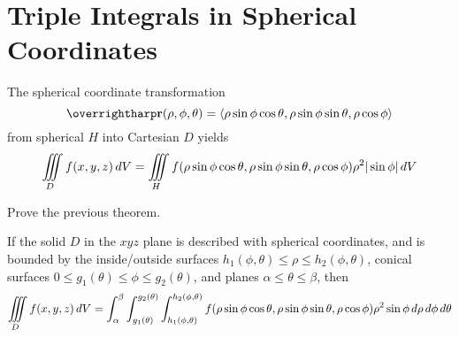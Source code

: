 \documentclass[letterpaper, twoside, 12pt]{book}
\begin{document}
          \begin{solution}

          \end{solution}

          \begin{contributors}

          \end{contributors}


\section{Triple Integrals in Spherical Coordinates} %

\begin{theorem}
  The spherical coordinate transformation
  \[
    \vect{r}(\rho,\phi,\theta)
      =
    \<\rho\sin\phi\cos\theta, \rho\sin\phi\sin\theta, \rho\cos\phi\>
  \]
  from spherical $H$ into Cartesian $D$ yields
  \[
    \iiint\limits_D f(x,y,z)\,d{V}
      =
    \iiint\limits_H
    f(\rho\sin\phi\cos\theta, \rho\sin\phi\sin\theta, \rho\cos\phi)
    \rho^2|\sin\phi|\,d{V}
  \]
\end{theorem}

          \begin{problem}
            Prove the previous theorem.
          \end{problem}

          \begin{solution}

          \end{solution}

          \begin{contributors}

          \end{contributors}

\begin{theorem}
  If the solid $D$ in the $xyz$ plane is described with spherical coordinates,
  and is bounded by the inside/outside surfaces
  $h_1(\phi,\theta)\leq \rho\leq h_2(\phi,\theta)$,
  conical surfaces $0\leq g_1(\theta)\leq\phi\leq g_2(\theta)$,
  and planes $\alpha\leq\theta\leq\beta$, then
    \[
      \iiint\limits_D f(x,y,z)\,d{V}
        =
      \int_\alpha^\beta\int_{g_1(\theta)}^{g_2(\theta)}
      \int_{h_1(\phi,\theta)}^{h_2(\phi,\theta)}
      f(\rho\sin\phi\cos\theta, \rho\sin\phi\sin\theta, \rho\cos\phi)
      \rho^2\sin\phi\,d{\rho}\,d{\phi}\,d{\theta}
    \]
\end{theorem}
\end{document}
